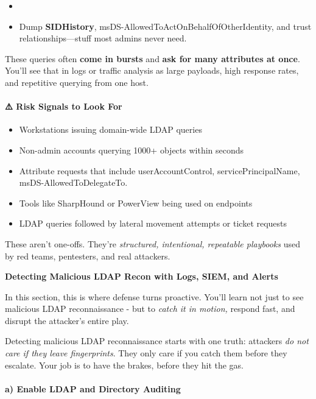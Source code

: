 {{\begin{itemize}
    \item 

    \item Dump \textbf{SIDHistory}, msDS-AllowedToActOnBehalfOfOtherIdentity, and trust relationships—stuff most admins never need.

\end{itemize}
These queries often \textbf{come in bursts} and \textbf{ask for many attributes at once}. You’ll see that in logs or traffic analysis as large payloads, high response rates, and repetitive querying from one host.

\paragraph{\textbf{⚠️ Risk Signals to Look For}}

\begin{itemize}
    \item Workstations issuing domain-wide LDAP queries
    \item Non-admin accounts querying 1000+ objects within seconds
    \item Attribute requests that include userAccountControl, servicePrincipalName, msDS-AllowedToDelegateTo.
    \item Tools like SharpHound or PowerView being used on endpoints
    \item LDAP queries followed by lateral movement attempts or ticket requests

\end{itemize}
These aren’t one-offs. They’re \textit{structured, intentional, repeatable playbooks} used by red teams, pentesters, and real attackers.

\textbf{Detecting Malicious LDAP Recon with Logs, SIEM, and Alerts}

In this section, this is where defense turns proactive. You’ll learn not just to see malicious LDAP reconnaissance - but to \textit{catch it in motion, }respond fast, and disrupt the attacker’s entire play.

Detecting malicious LDAP reconnaissance starts with one truth: attackers \textit{do not care if they leave fingerprints}. They only care if you catch them before they escalate. Your job is to have the brakes, before they hit the gas.

\paragraph{\textbf{   a) Enable LDAP and Directory Auditing}}

}}
